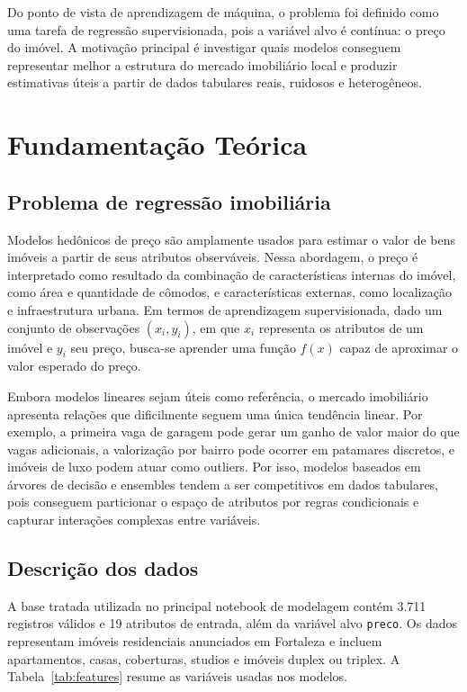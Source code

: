 \documentclass[12pt,a4paper]{article}
\begin{document}
Do ponto de vista de aprendizagem de máquina, o problema foi definido como uma tarefa de regressão supervisionada, pois a variável alvo é contínua: o preço do imóvel. A motivação principal é investigar quais modelos conseguem representar melhor a estrutura do mercado imobiliário local e produzir estimativas úteis a partir de dados tabulares reais, ruidosos e heterogêneos.

\section{Fundamentação Teórica}

\subsection{Problema de regressão imobiliária}

Modelos hedônicos de preço são amplamente usados para estimar o valor de bens imóveis a partir de seus atributos observáveis. Nessa abordagem, o preço é interpretado como resultado da combinação de características internas do imóvel, como área e quantidade de cômodos, e características externas, como localização e infraestrutura urbana. Em termos de aprendizagem supervisionada, dado um conjunto de observações $(x_i, y_i)$, em que $x_i$ representa os atributos de um imóvel e $y_i$ seu preço, busca-se aprender uma função $f(x)$ capaz de aproximar o valor esperado do preço.

Embora modelos lineares sejam úteis como referência, o mercado imobiliário apresenta relações que dificilmente seguem uma única tendência linear. Por exemplo, a primeira vaga de garagem pode gerar um ganho de valor maior do que vagas adicionais, a valorização por bairro pode ocorrer em patamares discretos, e imóveis de luxo podem atuar como outliers. Por isso, modelos baseados em árvores de decisão e ensembles tendem a ser competitivos em dados tabulares, pois conseguem particionar o espaço de atributos por regras condicionais e capturar interações complexas entre variáveis.

\subsection{Descrição dos dados}

A base tratada utilizada no principal notebook de modelagem contém 3.711 registros válidos e 19 atributos de entrada, além da variável alvo \texttt{preco}. Os dados representam imóveis residenciais anunciados em Fortaleza e incluem apartamentos, casas, coberturas, studios e imóveis duplex ou triplex. A Tabela~\ref{tab:features} resume as variáveis usadas nos modelos.
\end{document}
